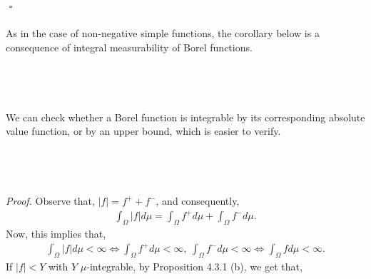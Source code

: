 \documentclass{article}
\begin{document}
${}$ \hfill $\square$ \\\\
As in the case of non-negative simple functions, the corollary below is a consequence of integral measurability of Borel functions.\\\\
\noindent{}\\\\\\
We can check whether a Borel function is integrable by its corresponding absolute value function, or by an upper bound, which is easier to verify.\\\\
\noindent{}\\\\\\
\textit{Proof.} Observe that, $|f| = f^+ + f^-$, and consequently,
\begin{eqnarray}
\nonumber
\int_\Omega |f| d\mu = \int_\Omega f^+ d\mu + \int_\Omega f^- d\mu.
\end{eqnarray}
Now, this implies that,
\begin{eqnarray}
\nonumber
\int_\Omega |f| d\mu < \infty \iff \int_\Omega f^+ d\mu < \infty, \ \int_\Omega f^- d\mu < \infty \iff \int_\Omega f d\mu < \infty.
\end{eqnarray}
If $|f| < Y$ with $Y$ $\mu$-integrable, by Proposition 4.3.1 (b), we get that,
\end{document}
